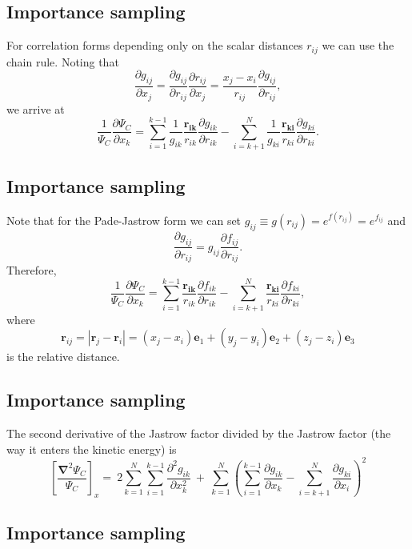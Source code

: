 \documentclass[%
oneside,                 %
final,                   %
10pt]{article}
\begin{document}
\subsection{Importance sampling}

For correlation forms depending only on the scalar distances $r_{ij}$ we can use the chain rule. Noting that 
\[
\frac{\partial g_{ij}}{\partial x_j} = \frac{\partial g_{ij}}{\partial r_{ij}} \frac{\partial r_{ij}}{\partial x_j} = \frac{x_j - x_i}{r_{ij}} \frac{\partial g_{ij}}{\partial r_{ij}},
\]
we arrive at
\[
\frac{1}{\Psi_C}\frac{\partial \Psi_C}{\partial x_k} = 
\sum_{i=1}^{k-1}\frac{1}{g_{ik}} \frac{\mathbf{r_{ik}}}{r_{ik}} \frac{\partial g_{ik}}{\partial r_{ik}}
-\sum_{i=k+1}^{N}\frac{1}{g_{ki}}\frac{\mathbf{r_{ki}}}{r_{ki}}\frac{\partial g_{ki}}{\partial r_{ki}}.
\]

\subsection{Importance sampling}

Note that for the Pade-Jastrow form we can set $g_{ij} \equiv g(r_{ij}) = e^{f(r_{ij})} = e^{f_{ij}}$ and 
\[
\frac{\partial g_{ij}}{\partial r_{ij}} = g_{ij} \frac{\partial f_{ij}}{\partial r_{ij}}.
\]
Therefore, 
\[
\frac{1}{\Psi_{C}}\frac{\partial \Psi_{C}}{\partial x_k} =
\sum_{i=1}^{k-1}\frac{\mathbf{r_{ik}}}{r_{ik}}\frac{\partial f_{ik}}{\partial r_{ik}}
-\sum_{i=k+1}^{N}\frac{\mathbf{r_{ki}}}{r_{ki}}\frac{\partial f_{ki}}{\partial r_{ki}},
\]
where 
\[
 \mathbf{r}_{ij} = |\mathbf{r}_j - \mathbf{r}_i| = (x_j - x_i)\mathbf{e}_1 + (y_j - y_i)\mathbf{e}_2 + (z_j - z_i)\mathbf{e}_3
\]
is the relative distance. 

\subsection{Importance sampling}

The second derivative of the Jastrow factor divided by the Jastrow factor (the way it enters the kinetic energy) is
\[
\left[\frac{\mathbf{\nabla}^2 \Psi_C}{\Psi_C}\right]_x =\  
2\sum_{k=1}^{N}
\sum_{i=1}^{k-1}\frac{\partial^2 g_{ik}}{\partial x_k^2}\ +\ 
\sum_{k=1}^N
\left(
\sum_{i=1}^{k-1}\frac{\partial g_{ik}}{\partial x_k} -
\sum_{i=k+1}^{N}\frac{\partial g_{ki}}{\partial x_i}
\right)^2
\]

\subsection{Importance sampling}
\end{document}

